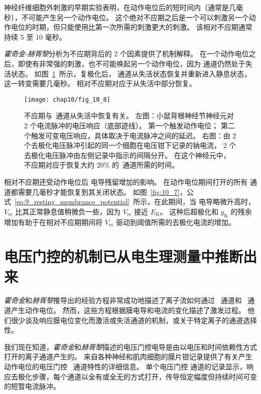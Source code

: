 神经纤维细胞外刺激的早期实验表明，在动作电位后的短时间内（通常是几毫秒），不可能产生另一个动作电位。 
这个绝对不应期之后是一个可以刺激另一个动作电位的时期，但只能使用比第一次所需的刺激更大的刺激。 
该相对不应期通常持续 5 至 10 毫秒。


\textit{霍奇金}-\textit{赫胥黎}分析为不应期背后的 2 个因素提供了机制解释。
在一个动作电位之后，即使有非常强的刺激，也不可能唤起另一个动作电位，因为  通道仍然处于失活状态。
如图~\ref{fig:10_8}~所示，复极化后， 通道从失活状态恢复并重新进入静息状态，这一转变需要几毫秒。
相对不应期对应于从失活中部分恢复。


\begin{figure}[htbp]
	\centering
	\texttt{[image: chap10/fig\_10\_8]}
	\caption{不应期与~通道从失活中恢复有关。
		左图：小鼠背根神经节神经元对 2 个电流脉冲的电压响应（底部迹线）。
		第一个触发动作电位；
		第二个触发可变电压响应，具体取决于电流脉冲之间的延迟。
		右图：由 2 个去极化电压脉冲引起的同一个细胞在电压钳下记录的钠电流， 2 个去极化电压脉冲由左侧记录中指示的间隔分开。
		在这个神经元中，不应期对应于恢复大约 20\% 的~通道所需的时间。}
	\label{fig:10_8}
\end{figure}


相对不应期还受动作电位后  电导残留增加的影响。
在动作电位期间打开的所有  通道都需要几毫秒才能恢复到其关闭状态。
如图~\ref{fig:10_7}，公式~\ref{eq:9_resting_membrance_potential}~所示，在此期间，当  电导略微升高时，$V_m$ 比其正常静息值稍微负一些，因为 $V_m$ 接近 $E_\text{K}$。
这种后超极化和 $g_\text{K}$ 的残余增加有助于在相对不应期期间将 $V_m$ 驱动到阈值所需的去极化电流的增加。




\section{电压门控的机制已从电生理测量中推断出来}

\textit{霍奇金}和\textit{赫胥黎}推导出的经验方程非常成功地描述了离子流如何通过~ 通道和~ 通道产生动作电位。
然而，这些方程根据膜电导和电流的变化描述了激发过程。
他们很少谈及响应膜电位变化而激活或失活通道的机制，或关于特定离子的通道选择性。


我们现在知道，\textit{霍奇金}和\textit{赫胥黎}描述的电压门控电导是由以电压和时间依赖性方式打开的离子通道产生的。
来自各种神经和肌肉细胞的膜片钳记录提供了有关产生动作电位的电压门控~ 通道特性的详细信息。
单个电压门控  通道的记录显示，响应去极化步骤，每个通道以全有或全无的方式打开，传导恒定幅度但持续时间可变的短暂电流脉冲。


